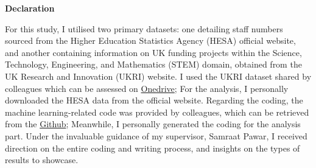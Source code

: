 \begin{center}
    \fontsize{20pt}{25pt}\selectfont
    \textbf{Declaration}
\end{center}
\vspace{1.5cm}

For this study, I utilised two primary datasets: one detailing staff numbers sourced from the Higher Education Statistics Agency (HESA) official website, and another containing information on UK funding projects within the Science, Technology, Engineering, and Mathematics (STEM) domain, obtained from the UK Research and Innovation (UKRI) website. I used the UKRI dataset shared by colleagues which can be assessed on \href{https://imperiallondon-my.sharepoint.com/personal/fcb5018_ic_ac_uk/_layouts/15/onedrive.aspx?id=\%2Fpersonal\%2Ffcb5018\%5Fic\%5Fac\%5Fuk\%2FDocuments\%2FFunding\%2DLandscape}{Onedrive}; For the analysis, I personally downloaded the HESA data from the official website. Regarding the coding, the machine learning-related code was provided by colleagues, which can be retrieved from the \href{https://github.com/FCBT/Funding-Landscape}{Github}; Meanwhile, I personally generated the coding for the analysis part. Under the invaluable guidance of my supervisor, Samraat Pawar, I received direction on the entire coding and writing process, and insights on the types of results to showcase.